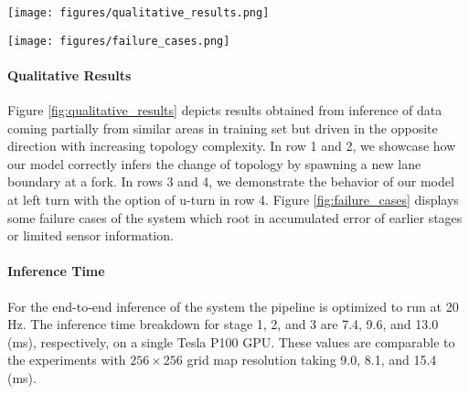 \documentclass[10pt,twocolumn,letterpaper]{article}
\begin{document}
\begin{figure*}[t]
     \centering
     \texttt{[image: figures/qualitative\_results.png]}
     \caption{Qualitative results of road topology predictions on the test data.}
     \label{fig:qualitative_results}
\end{figure*}
\begin{figure*}[t]
     \centering
     \texttt{[image: figures/failure\_cases.png]}
     \caption{Failure cases.}
     \label{fig:failure_cases}
\end{figure*}
\paragraph{Qualitative Results} Figure \ref{fig:qualitative_results} depicts results obtained from inference of data coming partially from similar areas in training set but driven in the opposite direction with increasing topology complexity. In row 1 and 2, we showcase how our model correctly infers the change of topology by spawning a new lane boundary at a fork. In rows 3 and 4, we demonstrate the behavior of our model at left turn with the option of u-turn in row 4. Figure \ref{fig:failure_cases} displays some failure cases of the system which root in accumulated error of earlier stages or limited sensor information.
\paragraph{Inference Time} For the end-to-end inference of the system the pipeline is optimized to run at 20 Hz. The inference time breakdown for stage 1, 2, and 3 are 7.4, 9.6, and 13.0 (ms), respectively, on a single Tesla P100 GPU. These values are comparable to the experiments with $256\times 256$ grid map resolution taking 9.0, 8.1, and 15.4 (ms).
\begin{table*}
\caption{Quantitative evaluation of the effectiveness of stage 1 outputs. The output subsets are: (a) Distance to ref. line, (b) Distance to ref. line + Direction of lane, (c) Distance to ref. line + Perp. direction of ref. line, and (d) All.}
\label{table:stage1_analysis}
\centering
{}
\end{table*}
\end{document}
